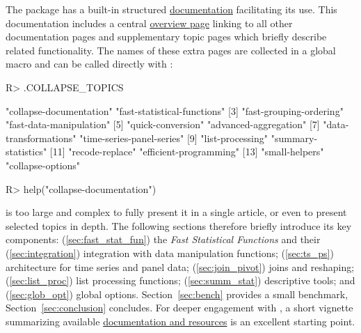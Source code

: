 \documentclass[nojss]{jss} %
\begin{document}
The package has a built-in structured \href{https://sebkrantz.github.io/collapse/reference/collapse-documentation.html}{documentation} facilitating its use. This documentation includes a central \href{https://sebkrantz.github.io/collapse/reference/collapse-documentation.html}{overview page} linking to all other documentation pages and supplementary topic pages which briefly describe related functionality. The names of these extra pages are collected in a global macro  and can be called directly with :
%
\begin{Schunk}
\begin{Sinput}
R> .COLLAPSE_TOPICS
\end{Sinput}
\begin{Soutput}
 [1] "collapse-documentation"     "fast-statistical-functions"
 [3] "fast-grouping-ordering"     "fast-data-manipulation"    
 [5] "quick-conversion"           "advanced-aggregation"      
 [7] "data-transformations"       "time-series-panel-series"  
 [9] "list-processing"            "summary-statistics"        
[11] "recode-replace"             "efficient-programming"     
[13] "small-helpers"              "collapse-options"          
\end{Soutput}
\begin{Sinput}
R> help("collapse-documentation")
\end{Sinput}
\end{Schunk}
%
 is too large and complex to fully present it in a single article, or even to present selected topics in depth. The following sections therefore briefly introduce its key components: (\ref{sec:fast_stat_fun}) the \emph{Fast Statistical Functions} and their (\ref{sec:integration}) integration with data manipulation functions; (\ref{sec:ts_ps}) architecture for time series and panel data; (\ref{sec:join_pivot}) joins and reshaping; (\ref{sec:list_proc}) list processing functions; (\ref{sec:summ_stat}) descriptive tools; and (\ref{sec:glob_opt}) global options. Section~\ref{sec:bench} provides a small benchmark, Section~\ref{sec:conclusion} concludes. For deeper engagement with , a short vignette summarizing available \href{https://sebkrantz.github.io/collapse/articles/collapse_documentation.html}{documentation and resources} is an excellent starting point.
%
\end{document}
